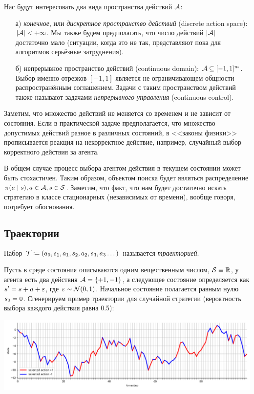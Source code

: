 Нас будут интересовать два вида пространства действий $\mathcal{A}$:
\begin{itemize}
    \item[а)] \emph{конечное}, или \emph{дискретное пространство действий} (discrete action space): $|\A| \HM< +\infty$. Мы также будем предполагать, что число действий $|\mathcal{A}|$ достаточно мало (ситуации, когда это не так, представляют пока для алгоритмов серьёзные затруднения).
    \item[б)] непрерывное пространство действий (continuous domain): $\A \HM\subseteq [-1, 1]^m$. Выбор именно отрезков $[-1, 1]$ является не ограничивающем общности распространённым соглашением. Задачи с таким пространством действий также называют задачами \emph{непрерывного управления} (continuous control).
\end{itemize}

\begin{remark}
Заметим, что множество действий не меняется со временем и не зависит от состояния. Если в практической задаче предполагается, что множество допустимых действий разное в различных состояний, в <<законы физики>> прописывается реакция на некорректное действие, например, случайный выбор корректного действия за агента.
\end{remark}

В общем случае процесс выбора агентом действия в текущем состоянии может быть стохастичен. Таким образом, объектом поиска будет являться распределение $\pi(a \mid s), a \HM\in \A, s \HM\in \St$. Заметим, что факт, что нам будет достаточно искать стратегию в классе стационарных (независимых от времени), вообще говоря, потребует обоснования.

\subsection{Траектории}

\begin{definition} 
Набор $\mathcal{T} \coloneqq \left( a_0, s_1, a_1, s_2, a_2, s_3, a_3 \dots \right) $ называется \emph{траекторией}.
\end{definition}

\begin{exampleBox}[label=ex:trajectory]{}
Пусть в среде состояния описываются одним вещественным числом, $\St \HM\equiv \R$, у агента есть два действия $\A \HM= \{+1, -1\}$, а следующее состояние определяется как $s' \HM= s + a + \eps$, где $\varepsilon \sim \mathcal{N}(0, 1)$. Начальное состояние полагается равным нулю $s_0 \HM= 0$. Сгенерируем пример траектории для случайной стратегии (вероятность выбора каждого действия равна 0.5):
    \begin{center}
    \includegraphics[width=\textwidth]{Images/traj.png}
    \end{center}
\end{exampleBox}

